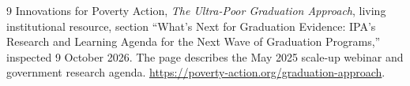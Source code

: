 \documentclass[11pt]{article}
\theoremstyle{remark}
\begin{document}
\begin{thebibliography}{9}
 Innovations for Poverty Action, \emph{The Ultra-Poor Graduation Approach}, living institutional resource, section ``What's Next for Graduation Evidence: IPA's Research and Learning Agenda for the Next Wave of Graduation Programs,'' inspected 9 October 2026. The page describes the May 2025 scale-up webinar and government research agenda. \url{https://poverty-action.org/graduation-approach}.
\end{thebibliography}
\end{document}
